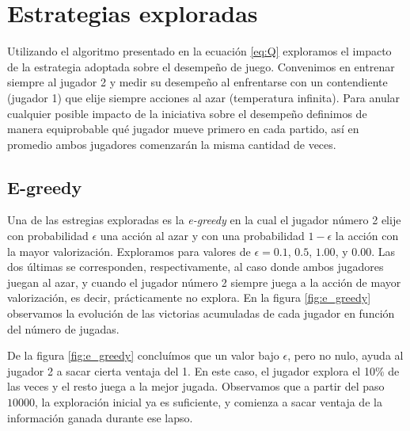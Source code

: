 \documentclass[11pt, spanish]{article}
\begin{document}
\section{Estrategias exploradas}
\par Utilizando el algoritmo presentado en la ecuación \ref{eq:Q} exploramos 
el impacto de la estrategia adoptada sobre el desempeño de juego. Convenimos en 
entrenar siempre al jugador 2 y medir su desempeño al enfrentarse con un 
contendiente (jugador 1) que elije siempre acciones al azar (temperatura 
infinita). Para anular cualquier posible impacto de la iniciativa sobre el 
desempeño definimos de manera equiprobable qué jugador mueve primero en cada 
partido, así en promedio ambos jugadores comenzarán la misma cantidad de veces.

\subsection{E-greedy}
\par Una de las estregias exploradas es la \emph{e-greedy} en la cual el 
jugador número 2 elije con probabilidad $\epsilon$ una acción al azar y con 
una probabilidad $1-\epsilon$ la acción con la mayor valorización. Exploramos 
para valores de $\epsilon = 0.1$, $0.5$, $1.00$, y $0.00$. Las dos últimas se 
corresponden, respectivamente, al caso donde ambos jugadores juegan al azar, y 
cuando el jugador número 2 siempre juega a la acción de mayor valorización, es 
decir, prácticamente no explora. En la figura \ref{fig:e_greedy} observamos la 
evolución de las victorias acumuladas de cada jugador en función del número de 
jugadas.
\par De la figura \ref{fig:e_greedy} concluímos que un valor bajo $\epsilon$, pero no nulo, ayuda al jugador 2 a sacar cierta ventaja del 1. En este caso, el jugador explora el 10\% de las veces y el resto juega a la mejor jugada. Observamos que a partir del paso $10000$, la exploración inicial ya es suficiente, y comienza a sacar ventaja de la información ganada durante ese lapso. 
\end{document}
